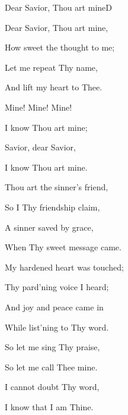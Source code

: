\documentclass[12pt]{book}
\newcommand{\RevDate}{\today}
\begin{document}
\begin{song}{Dear Savior, Thou art mine}{D}
  {}
  {}
  {}
  {}

  \renewcommand{\RevDate}{February~11,~1993}

  \begin{SBVerse}
    Dear Savior, Thou art mine,

    How sweet the thought to me;

    Let me repeat Thy name,

    And lift my heart to Thee.
  \end{SBVerse}

  \begin{SBOpGroup}
    Mine! Mine! Mine!

    I know Thou art mine;

    Savior, dear Savior,

    I know Thou art mine.

  \end{SBOpGroup}

  \begin{SBVerse}
    Thou art the sinner’s friend,

    So I Thy friendship claim,

    A sinner saved by grace,

    When Thy sweet message came.
  \end{SBVerse}

  \begin{SBVerse}
    My hardened heart was touched;

    Thy pard’ning voice I heard;

    And joy and peace came in

    While list’ning to Thy word.
  \end{SBVerse}

  \begin{SBVerse}

    So let me sing Thy praise,

    So let me call Thee mine.

    I cannot doubt Thy word,

    I know that I am Thine.
  \end{SBVerse}
\end{song}
\end{document}
